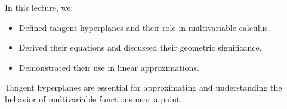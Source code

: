 \documentclass{article}
\begin{document}
In this lecture, we:
\begin{itemize}
  \item Defined tangent hyperplanes and their role in multivariable calculus.
  \item Derived their equations and discussed their geometric significance.
  \item Demonstrated their use in linear approximations.
\end{itemize}

Tangent hyperplanes are essential for approximating and understanding the behavior of multivariable functions near a point.
\end{document}
